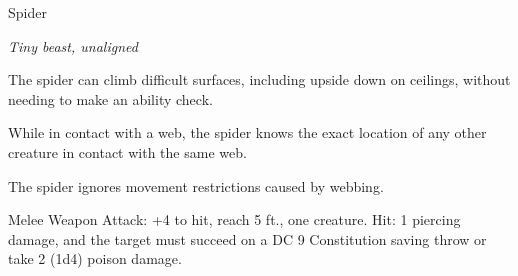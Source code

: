 \begin{monsterbox}{Spider}
\begin{hangingpar}
\textit{Tiny beast, unaligned}
\end{hangingpar}
\dndline%
\basics[%
armorclass = 12,
hitpoints = 1d4 - 1,
speed = {20 ft., climb 20 ft.}
]
\dndline%
\stats[%
STR = \stat{2},
DEX = \stat{14},
CON = \stat{8},
INT = \stat{1},
WIS = \stat{10},
CHA = \stat{2}
]
\dndline%
\details[%
skills={Stealth +4, },
damageimmunities={},
savingthrows={},
conditionimmunities={},
damageresistances={},
damagevulnerabilities={},
senses={darkvision 30 ft., passive Perception 12},
challenge=0
]
\dndline%
\begin{monsteraction}
The spider can climb difficult surfaces, including upside down on ceilings, without needing to make an ability check.
\end{monsteraction}
\begin{monsteraction}
While in contact with a web, the spider knows the exact location of any other creature in contact with the same web.
\end{monsteraction}
\begin{monsteraction}
The spider ignores movement restrictions caused by webbing.
\end{monsteraction}
\begin{monsteraction}[Bite]
Melee Weapon Attack: +4 to hit, reach 5 ft., one creature. Hit: 1 piercing damage, and the target must succeed on a DC 9 Constitution saving throw or take 2 (1d4) poison damage.
\end{monsteraction}
\end{monsterbox}